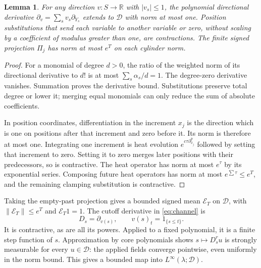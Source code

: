 \documentclass[11pt]{article}
\newtheorem{lemma}[theorem]{Lemma}
\theoremstyle{remark}\newtheorem{remark}[theorem]{Remark}
\newcommand{\R}{\mathbb R}\newcommand{\N}{\mathbb N}
\newcommand{\D}{\mathcal D}\newcommand{\E}{\mathcal E}
\newcommand{\norm}[1]{\left\lVert#1\right\rVert}
\begin{document}
\begin{lemma}\label{lem:operators}
For any direction $v:S\to\R$ with $|v_s|\leq1$, the polynomial
directional derivative $\partial_v=\sum_s v_s\partial_{Y_s}$
extends to $\D$ with norm at most one. Position substitutions that
send each variable to another variable or zero, without scaling
by a coefficient of modulus greater than one, are contractions.
The finite signed projection $\Pi_j$ has norm at most $e^T$ on
each cylinder norm.
\end{lemma}
\begin{proof}
For a monomial of degree $d>0$, the ratio of the weighted norm of
its directional derivative to $d!$ is at most
$\sum_s\alpha_s/d=1$. The degree-zero derivative vanishes.
Summation proves the derivative bound. Substitutions preserve
total degree or lower it; merging equal monomials can only reduce
the sum of absolute coefficients.

In position coordinates, differentiation in the increment $x_j$
is the direction which is one on positions after that increment
and zero before it. Its norm is therefore at most one.
Integrating one increment is heat evolution
$e^{c\tau\partial_{x_j}^p}$ followed by setting that increment
to zero. Setting it to zero merges later positions with their
predecessors, so is contractive. The heat operator has norm at
most $e^\tau$ by its exponential series. Composing future heat
operators has norm at most $e^{\sum\tau}\leq e^T$, and the
remaining clamping substitution is contractive.
\end{proof}

Taking the empty-past projection gives a bounded signed mean
$\E_T$ on $\D$, with $\norm{\E_T}\leq e^T$ and $\E_T1=1$.
The cutoff derivative in \eqref{eq:channel} is
\begin{equation}\label{eq:Ds}
 D_s=\partial_{v(s)},\qquad v(s)_t=1_{\{s\leq t\}}.
\end{equation}
It is contractive, as are all its powers. Applied to a fixed
polynomial, it is a finite step function of $s$. Approximation
by core polynomials shows $s\mapsto D_s^r u$ is strongly measurable
for every $u\in\D$: the applied fields converge pointwise, even
uniformly in the norm bound. This gives a bounded map into
$L^\infty(\lambda;\D)$.
\end{document}

